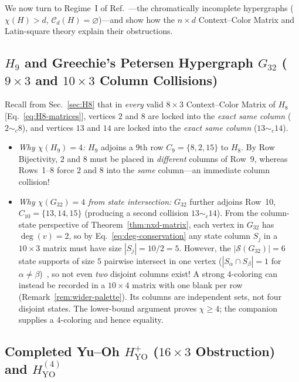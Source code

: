 \documentclass[aps,pra,reprint,superscriptaddress,longbibliography,nofootinbib,floatfix,10pt]{revtex4-2}
\theoremstyle{definition}\newtheorem{definition}[theorem]{Definition}
\theoremstyle{remark}\newtheorem{remark}[theorem]{Remark}
\newcommand{\Sc}{\mathcal S}\newcommand{\Cc}{\mathcal C}
\newcommand{\YO}{\mathrm{YO}}\newcommand{\ip}[2]{\langle #1,#2\rangle}
\begin{document}
We now turn to Regime~I of Ref.~\cite{svozil2026contexts}—the chromatically incomplete hypergraphs ($\chi(H)>d$, $\Cc_d(H)=\varnothing$)—and show how the $n\times d$ Context--Color Matrix and Latin-square theory explain their obstructions.

\subsection{\texorpdfstring{$H_9$}{H9} and Greechie's Petersen Hypergraph \texorpdfstring{$G_{32}$}{G32} (\texorpdfstring{$9\times 3$ and $10\times 3$}{9x3 and 10x3} Column Collisions)}\label{sec:G32}

Recall from Sec.~\ref{sec:H8} that in \emph{every} valid $8\times 3$ Context--Color Matrix of $H_8$ [Eq.~\eqref{eq:H8-matrices}], vertices $2$ and $8$ are locked into the \emph{exact same column} ($2\sim_c 8$), and vertices $13$ and $14$ are locked into the \emph{exact same column} ($13\sim_c 14$).
\begin{itemize}
\item \emph{Why $\chi(H_9)=4$:} $H_9$ adjoins a $9$th row $C_9=\{8,2,15\}$ to $H_8$. By Row Bijectivity, $2$ and $8$ must be placed in \emph{different} columns of Row~9, whereas Rows~1--8 force $2$ and $8$ into the \emph{same} column—an immediate column collision!
\item \emph{Why $\chi(G_{32})=4$ from state intersection:} $G_{32}$ further adjoins Row~10, $C_{10}=\{13,14,15\}$ (producing a second collision $13\sim_c 14$). From the column-state perspective of Theorem~\ref{thm:nxd-matrix}, each vertex in $G_{32}$ has $\deg(v)=2$, so by Eq.~\eqref{eq:deg-conservation} any state column $S_j$ in a $10\times 3$ matrix must have size $|S_j|=10/2=5$. However, the $|\Sc(G_{32})|=6$ state supports of size $5$ pairwise intersect in one vertex ($|S_\alpha\cap S_\beta|=1$ for $\alpha\neq\beta$)~\cite{svozil2026contexts}, so not even \emph{two} disjoint columns exist! A strong 4-coloring can instead be recorded in a $10\times4$ matrix with one blank per row (Remark~\ref{rem:wider-palette}). Its columns are independent sets, not four disjoint states. The lower-bound argument proves $\chi\ge4$; the companion supplies a 4-coloring and hence equality.
\end{itemize}

\subsection{Completed Yu--Oh \texorpdfstring{$H_{\YO}^+$}{HYO+} (\texorpdfstring{$16\times 3$}{16x3} Obstruction) and \texorpdfstring{$H_{\YO}^{(4)}$}{HYO(4)}}\label{sec:HYO}
\end{document}

